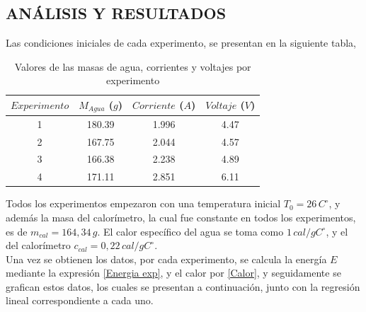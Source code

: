 \documentclass[10pt]{article}
\begin{document}
\begin{multicols*}{2}
\section{\small ANÁLISIS Y RESULTADOS}

Las condiciones iniciales de cada experimento, se presentan en la siguiente tabla,

\begin{table}[H]
\centering
\caption{Valores de las masas de agua, corrientes y voltajes por experimento}
\begin{tabular}{cccc}
\hline
\hline
$Experimento$ & $M_{Agua}$ ($g$) & $Corriente$ ($A$) & $Voltaje$ ($V$) \\
\hline
\hline
1 & 180.39 & 1.996 & 4.47 \\
2 & 167.75 & 2.044 & 4.57 \\
3 & 166.38 & 2.238 & 4.89 \\
4 & 171.11 & 2.851 & 6.11 \\
\hline
\end{tabular}
\end{table}

Todos los experimentos empezaron con una temperatura inicial $T_0=26\, C ^\circ$, y además la masa del calorímetro, la cual fue constante en todos los experimentos, es de $m_{cal} = 164,34 \,g $. El calor específico del agua se toma como $1 \, cal/g C ^\circ$, y el del calorímetro $c_{cal} = 0,22\, cal/g C ^\circ$.\\

Una vez se obtienen los datos, por cada experimento, se calcula la energía $E$ mediante la expresión \ref{Energia exp}, y el calor por \ref{Calor}, y seguidamente se grafican estos datos, los cuales se presentan a continuación, junto con la regresión lineal correspondiente a cada uno.



\end{multicols*}
\end{document}
